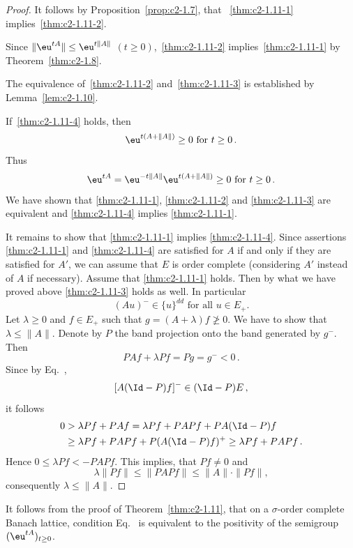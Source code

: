 \begin{proof}
It follows by Proposition~\ref{prop:c2-1.7},  that ~\ref{thm:c2-1.11-1}   implies~\ref{thm:c2-1.11-2}.

Since $\|\eu^{tA}\| \leq \eu^{t\|A\|}$ $(t\geq0)$,~\ref{thm:c2-1.11-2}   implies~\ref{thm:c2-1.11-1}   by Theorem~\ref{thm:c2-1.8}.

The equivalence of~\ref{thm:c2-1.11-2}   and~\ref{thm:c2-1.11-3}   is established by Lemma~\ref{lem:c2-1.10}.

If~\ref{thm:c2-1.11-4} holds, then 
\[
\eu^{t(A+\|A\|)} \geq 0 \text{ for } t\geq 0\,.
\]
Thus 
\[
\eu^{tA} = \eu^{-t\|A\|} \eu^{t(A+\|A\|)} \geq 0 \text{ for } t\geq 0\,.
\]
We have shown that \ref{thm:c2-1.11-1}, \ref{thm:c2-1.11-2}  and \ref{thm:c2-1.11-3} are equivalent and \ref{thm:c2-1.11-4}  implies \ref{thm:c2-1.11-1}.

It remains to show that \ref{thm:c2-1.11-1}  implies \ref{thm:c2-1.11-4}.
Since assertions \ref{thm:c2-1.11-1}   and \ref{thm:c2-1.11-4}  are satisfied for $A$ if and only if they are satisfied for $A'$, we can assume that $E$ is order complete (considering $A'$ instead of\/ $A$ if necessary).
Assume that \ref{thm:c2-1.11-1}   holds.
Then by what we have proved above \ref{thm:c2-1.11-3}   holds as well.
In particular
\begin{equation}\label{eq:c2-1.9}
(Au)^{-} \in \{u\}^{dd} \text{ for all } u \in E_{+}.
\end{equation}
Let $\lambda \geq 0$ and $f \in E_{+}$ such that $g = (A + \lambda)f \not\geq 0$.
We have to show that $\lambda \leq \|A\|$.
Denote by $P$ the band projection onto the band generated by $g^{-}$.
Then 
\[
PAf + \lambda Pf = Pg = g^{-} < 0\,.
\]
Since by  Eq.~, 
\[
[A(\Id - P)f]^{-} \in (\Id - P)E\,,
\]
it follows 
\begin{equation*}
    \begin{split}
    0 &> \lambda Pf + PAf = \lambda Pf + PAPf + PA(\Id-P)f \\
    &\geq \lambda Pf + PAPf + P(A(\Id-P)f)^{+} \geq \lambda Pf + PAPf\,.
    \end{split}
\end{equation*}
Hence $0 \leq \lambda Pf < -PAPf$.
This implies, that $Pf \neq 0$ and 
%
\[
	\lambda\|Pf\| \leq \|PAPf\| \leq \|A\|\cdot\|Pf\| ,
\]
%
consequently $\lambda \leq \|A\|$.
\end{proof}
\begin{remark}\label{rem:c2-1.12}
%
It follows from the proof of Theorem~\ref{thm:c2-1.11}, that on a $\sigma$-order complete Banach lattice, condition  Eq.~ is equivalent to the positivity of the semigroup $(\eu^{tA})_{t \geq 0}$.
\end{remark}
